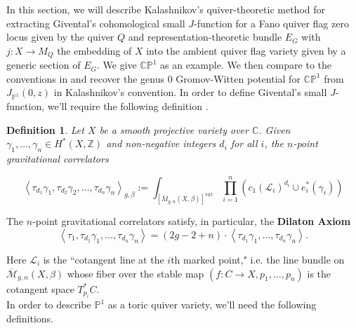 \documentclass{amsart}
\newtheorem{definition}[theorem]{Definition}
\newcommand{\PP}{\mathbb{P}}\newcommand{\A}{\mathbb{A}}\newcommand{\Z}{\mathbb{Z}}\newcommand{\C}{\mathbb{C}}\newcommand{\N}{\mathbb{N}}\newcommand{\T}{\mathbb{T}}
\begin{document}
In this section, we will describe Kalashnikov's \cite{Kalashnikov} quiver-theoretic method for extracting Givental's cohomological small $J$-function for a Fano quiver flag zero locus given by the quiver $Q$ and representation-theoretic bundle $E_G$ with $j: X \rightarrow M_Q$ the embedding of $X$ into the ambient quiver flag variety given by a generic section of $E_G$. We give $\C \PP^1$ as an example. We then compare to the conventions in \cite{coxkatxMSAG} and recover the genus $0$ Gromov-Witten potential for $\C \PP^1$ from $J_{\PP^1}(0,z)$ in Kalashnikov's convention. In order to define Givental's small $J$-function, we'll require the following definition \cite[302]{coxkatxMSAG}. 

\begin{definition} Let $X$ be a smooth projective variety over $\C$. Given $\gamma_1, \dots, \gamma_n \in H^*(X, \Z)$ and non-negative integers $d_i$ for all $i$, the $n$-point gravitational correlators 

\[ \left< \tau_{d_1} \gamma_1, \tau_{d_2}\gamma_2, \dots, \tau_{d_n}\gamma_n \right>_{g,\beta} := \int_{ \left[ \overline{M}_{g,n}(X,\beta)\right]^{\text{virt}}} \prod_{i=1}^n (c_1 (\mathcal{L}_i)^{d_i} \cup e_i^*(\gamma_i) ) \]

\end{definition}

The $n$-point gravitational correlators satisfy, in particular, the \textbf{Dilaton Axiom}\label{axiom: dilatonAxiom} \[ \left< \tau_1, \tau_{d_1}\gamma_1, \dots, \tau_{d_n}\gamma_n \right> = (2g-2+n) \cdot \left< \tau_{d_1}\gamma_1, \dots, \tau_{d_n}\gamma_n \right>. \] 
 Here $\mathcal{L}_i$ is the ``cotangent line at the $i$th marked point," i.e. the line bundle on $\overline{\mathcal{M}}_{g,n}(X,\beta)$ whose fiber over the stable map $(f: C \rightarrow X, p_1, \dots, p_n )$ is the cotangent space $T^*_{p_i}C$. \\





In order to describe $\PP^1$ as a toric quiver variety, we'll need the following definitions. 
\end{document}
